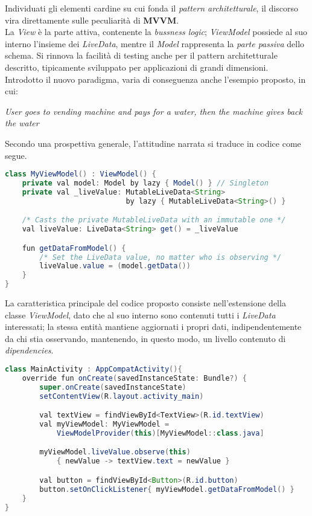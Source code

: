 \documentclass{article}
\begin{document}
Individuati gli elementi cardine su cui fonda il \textit{pattern architetturale}, il discorso vira direttamente sulle peculiarità di \textbf{MVVM}.\vspace*{7pt}\\
La \textit{View} è la parte attiva, contenente la \textit{bussness logic}; \textit{ViewModel} possiede al suo interno l'insieme dei \textit{LiveData}, mentre il \textit{Model} rappresenta la \textit{parte passiva} dello schema. Si rinnova la facilità di testing anche per il pattern architetturale descritto, tipicamente sviluppato per applicazioni di grandi dimensioni.\vspace*{7pt}\\
Introdotto il nuovo paradigma, varia di conseguenza anche l'esempio proposto, in cui:
\begin{center}
    \textit{User goes to vending machine and pays for a water, then the machine gives back the water}
\end{center}
Secondo una prospettiva generale, l'attitudine narrata si traduce in codice come segue.
\begin{lstlisting}[language = JAVA]
class MyViewModel() : ViewModel() {
    private val model: Model by lazy { Model() } // Singleton
    private val _liveValue: MutableLiveData<String> 
                            by lazy { MutableLiveData<String>() }

    /* Casts the private MutableLiveData with an immutable one */
    val liveValue: LiveData<String> get() = _liveValue

    fun getDataFromModel() {
        /* Set the LiveData value, no matter who is observing */
        liveValue.value = (model.getData())
    }
}
\end{lstlisting}
La caratteristica principale del codice proposto consiste nell'estensione della classe \textit{ViewModel}, dato che al suo interno sono contenuti tutti i \textit{LiveData} interessati; la stessa entità mantiene aggiornati i propri dati, indipendentemente da chi stia osservando, mantenendo, in questo modo, un livello contenuto di \textit{dipendencies}.
\begin{lstlisting}[language = JAVA]
class MainActivity : AppCompatActivity(){
    override fun onCreate(savedInstanceState: Bundle?) {
        super.onCreate(savedInstanceState)
        setContentView(R.layout.activity_main)

        val textView = findViewById<TextView>(R.id.textView)
        val myViewModel: MyViewModel = 
            ViewModelProvider(this)[MyViewModel::class.java]

        myViewModel.liveValue.observe(this)
            { newValue -> textView.text = newValue }

        val button = findViewById<Button>(R.id.button)
        button.setOnClickListener{ myViewModel.getDataFromModel() }
    }
}
\end{lstlisting}
\end{document}

